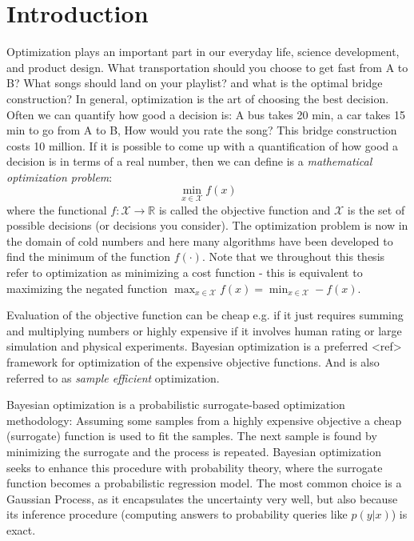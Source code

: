 \chapter{Introduction}

Optimization plays an important part in our everyday life, science development, and product design.
What transportation should you choose to get fast from A to B? What songs should
land on your playlist? and what is the optimal bridge construction? In general, optimization is the
art of choosing the best decision. Often we can quantify how good a decision is: A bus takes 20 min,
a car takes 15 min to go from A to B, How would you rate the song?
This bridge construction costs 10 million. If it is possible to come up with a quantification of how good
a decision is in terms of a real number, then we can define is a \textit{mathematical optimization problem}: 
$$\min_{x\in \mathcal{X}} f(x)$$ where the functional $f: \mathcal{X} \rightarrow \mathbb{R}$ is
called the objective function and $\mathcal{X}$ is the set of possible decisions (or decisions you consider).
The optimization problem is now in the domain of cold numbers and here many algorithms have been developed
to find the minimum of the function $f(\cdot)$. Note that we throughout this thesis refer to
optimization as minimizing a cost function - this is equivalent to maximizing the negated function
$\max_{x\in \mathcal{X}} f(x) = \min_{x\in \mathcal{X}} -f(x)$.  

Evaluation of the objective function can be cheap e.g. if it just requires
summing and multiplying numbers or highly expensive if it involves human rating or large simulation
and physical experiments. Bayesian optimization is a preferred <ref> framework for optimization of
the expensive objective functions. And is also referred to as \textit{sample efficient}
optimization.

Bayesian optimization is a probabilistic surrogate-based optimization methodology: Assuming some samples from a
highly expensive objective a cheap (surrogate) function is used to fit the samples. The next sample
is found by minimizing the surrogate and the process is repeated. Bayesian optimization seeks to
enhance this procedure with probability theory, where the surrogate function becomes a probabilistic
regression model. The most common choice is a Gaussian Process, as it encapsulates the uncertainty very well,
but also because its inference procedure (computing answers to probability queries like $p(y|x)$) is exact.

